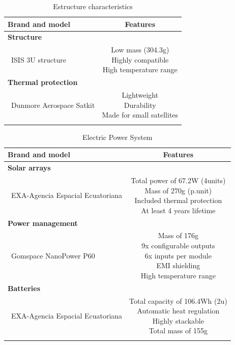 \begin{longtable}{| l | c  }
	\hline
	\rowcolor[gray]{0.80}	\textbf{Brand and model} &  \textbf{Features}     \\
	\hline
	\endfirsthead
	
	\rowcolor[gray]{0.85} \textbf{Structure} &  \\
	~ISIS 3U structure & \makecell{Low mass (304.3g) \\ Highly compatible \\ High temperature range}\\
	\hline
	\rowcolor[gray]{0.85} \textbf{Thermal protection} &  \\
	~Dunmore Aerospace Satkit & \makecell{Lightweight \\ Durability \\ Made for small satellites}\\
	\hline
		
	\caption{Estructure characteristics}
	\label{structureoptions}
\end{longtable}

\begin{longtable}{| l | c | }
	\hline
	\rowcolor[gray]{0.80}	\textbf{Brand and model} &  \textbf{Features}     \\
	\hline
	\endfirsthead
	
	\rowcolor[gray]{0.85} \textbf{Solar arrays} &  \\
	~EXA-Agencia Espacial Ecuatoriana & \makecell{Total power of 67.2W (4units)\\ Mass of 270g (p.unit) \\ Included thermal protection \\At least 4 years lifetime}  \\
	\hline
	\rowcolor[gray]{0.85} \textbf{Power management} &   \\
	~Gomspace NanoPower P60 & \makecell{Mass of 176g \\ 9x configurable outputs \\ 6x inputs per module \\ EMI shielding \\ High temperature range} \\
	\hline
	\rowcolor[gray]{0.85} \textbf{Batteries} &   \\
	~EXA-Agencia Espacial Ecuatoriana & \makecell{Total capacity of 106.4Wh (2u)\\ Automatic heat regulation \\ Highly stackable \\ Total mass of 155g} \\
	\hline
	
	\caption{Electric Power System}
	\label{epsoptions}
\end{longtable}
\clearpage

